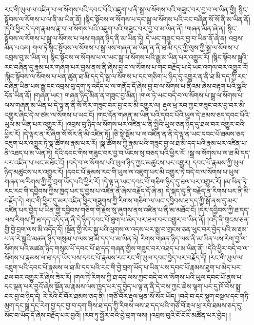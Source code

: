རང་གི་ཡུལ་ལ་འཛིན་པ་ལ་སོགས་པའི་དབང་པོའི་འཇུག་པ་ནི་སྒྲ་ལ་སོགས་པའི་གཟུང་བར་བྱ་བ་ལ་ཡིན་གྱི། སྙིང་སྟོབས་ལ་སོགས་པ་ལ་ནི་མ་ཡིན་ནོ། །སྙིང་སྟོབས་ལ་སོགས་པ་དང་སྒྲ་ལ་སོགས་པའི་རང་བཞིན་སོ་སོ་ནི་མ་ཡིན་ནོ། །དེའི་ཕྱིར་དེ་དག་རྣམས་རྣ་བ་ལ་སོགས་པའི་འཇུག་པའི་གཟུང་བར་བྱ་བ་མ་ཡིན་ནོ། །གཞན་མིན་ཞེ་ན། སྙིང་སྟོབས་ལ་སོགས་པ་སྒྲ་ལ་སོགས་པ་ལས་གཞན་ཉིད་ནི་མ་ཡིན་ཏེ། དེ་ཡང་གཟུང་བར་བྱ་བ་ཡིན་ནོ་ཞེ་ན། འབྲས་མིན་པའམ། གལ་ཏེ་སྙིང་སྟོབས་ལ་སོགས་པ་སྒྲ་ལས་གཞན་མ་ཡིན་ན་ནི་ཐ་མི་དད་ཀྱི་ལུས་ཀྱི་སྒྲ་ལ་སོགས་པ་འབྲས་བུ་མ་ཡིན་ལ། སྙིང་སྟོབས་ལ་སོགས་པ་ལ་ཡང་སྒྲ་ལ་སོགས་པའི་རྒྱུ་མ་ཡིན་པར་འགྱུར་རོ། །སྙིང་སྟོབས་སྒྲའི་རང་བཞིན་དུ་རྣམ་པར་གཞག་པར་བྱས་ནས་ནི་ཞེས་བྱ་བ་ལ་སོགས་པ་གང་བརྗོད་པ་དེ་ཡང་འགལ་བར་འགྱུར་རོ། །སྙིང་སྟོབས་ལ་སོགས་པ་ཕན་ཚུན་ཐ་མི་དད་དེ་སྒྲ་ལ་སོགས་པ་དང་གཅིག་པ་ཉིད་དུ་འགྱུར་ན་ནི་ཐ་མི་དད་ཀྱི་རང་བཞིན་ཡིན་པས་རྒྱུ་དང་འབྲས་བུ་དག་ཏུ་འདོད་པ་ལ་གནོད་དོ་ཞེས་བྱ་བ་ལ་སོགས་པ་ནིའམ་ཞེས་བརྟག་པའི་སྒྲའི་དོན་ཡིན་ནོ། །གཞན་ཡང་། གཞན་ཉིད་མིན་ན་གཟུང་བྱ་མིན། །གལ་ཏེ་ཡང་བདེ་བ་ལ་སོགས་པ་སྒྲ་ལ་སོགས་པ་ལས་གཞན་མ་ཡིན་པ་དེ་ལྟ་ན་ནི་སོ་སོར་གཟུང་བར་བྱ་བར་མི་འགྱུར་ལ། རྡུལ་ཕྲ་རབ་ཀྱང་གཟུང་བར་བྱ་བར་མི་འགྱུར་ཞིང་དེ་ལ་ཙམ་ལ་སོགས་པ་ཡང་ངོ། །གང་དོན་གཞན་མ་ཡིན་པའི་དབང་པོའི་ཡུལ་དེ་ཐམས་ཅད་དབང་པོའི་ཡུལ་མ་ཡིན་པར་འགྱུར་རོ། །འབྲས་བུ་ཉིད་ལ་སོགས་པར་འཛིན་པ་ནི་སྤྱིའི་ཡུལ་ཅན་ཉིད་དུ་ཐལ་བར་འགྱུར་བའི་ཕྱིར་རོ། །དེ་ལྟར་ན་རེ་ཞིག་སོ་སོར་ནི་མི་འཛིན་ཏོ། །ཅི་སྟེ་སྡོམ་པ་ལ་འཛིན་ན་ནི་དེ་ལྟ་ན་ཡང་དབང་པོ་ཐམས་ཅད་འཇུག་པར་འགྱུར་ཏེ་སྣ་ཚོགས་རྣམ་པར་རོ། །སྣ་ཚོགས་ཀྱི་རྣམ་པའི་གཟུང་བྱ་ལ་ཐ་མི་དད་པའི་རྣམ་པར་འཛིན་པ་ནི་འཐད་པ་མ་ཡིན་ཏེ། དེའི་དབང་གིས་གཟུང་བར་བྱ་བ་ཡོངས་སུ་བཅད་པའི་ཕྱིར་རོ། །སྒྲ་ལ་སོགས་པ་ལ་ཐ་མི་དད་པར་འཛིན་པ་ཡང་མཐོང་ངོ། །བདེ་བ་ལ་སོགས་པའི་ཡུལ་ཉིད་ཀྱང་མཚུངས་པར་འགྱུར། དབང་པོ་རྣམས་ཀྱི་ཡུལ་ཉིད་མཚུངས་པར་འགྱུར་རོ། །དབང་པོ་རྣམས་རང་གི་ཡུལ་ལ་འཇུག་པར་མི་འགྱུར་ཏེ་བདེ་བ་ལ་སོགས་པ་ཡུལ་གཞན་ལ་རིགས་ཀྱི་བྱེ་བྲག་ཡོད་པའི་ཕྱིར་རོ། །དེ་ལྟ་ན་ཡང་དབང་པོ་གཅིག་ཉིད་དུ་ཐལ་པར་འགྱུར་རོ། །མ་ཡིན་ཏེ་རང་རང་གི་དབྱིབས་ཀྱིས་ཁྱད་པར་དུ་བྱས་པ་འཛིན་ནོ་ཞེས་བརྗོད་དོ་ཞེ་ན། དེ་སྐད་དུ་ནི་བརྗོད་ན་རིགས་པར་ནི་མི་བརྗོད་དེ། གང་གི་ཕྱིར་དུ་མར་འཛིན་ཕྱིར་གཟུགས་ཀྱི་རིགས་གཅིག་ལ་ཡང་དབྱིབས་ཐ་དད་ཀྱི་སྒོ་ནས་དུ་མར་འཛིན་པར་བྱེད་པ་ཡིན་གྱི་དབྱིབས་གཅིག་གི་རྗེས་སུ་ཞུགས་ནས་འཛིན་པ་ནི་མ་མཐོང་ངོ། །དེར་དབྱིབས་ཀྱི་ཐ་དད་ལས་རིགས་ཀྱི་ཐ་དད་འདོད་ན་ནི་དེ་ཉིད་དབང་པོ་ཐུག་པ་མེད་པར་ཐལ་བར་འགྱུར་བ་ཡིན་ནོ། །འདི་ནི་གྲངས་ཅན་གྱི་བྱེ་བྲག་ལས་མི་འདོད་དོ། །སྔོན་གྱི་སེར་སྐྱ་པའི་ལུགས་ལ་འདས་པར་སྨྲ་བ་གྲངས་ཅན་ཕུང་བར་བྱེད་པའི་མ་རྡུམ་པ་ན་རེ་སྒྲའི་མཚན་ཉིད་གསུམ་པ་ལས་ཐ་མི་དད་པ་མ་ཡིན་ཏེ། རིགས་གཞན་ཉིད་ལས་ནི་མ་ཡིན་པས་རེག་བྱ་ལ་སོགས་པའི་མཚན་ཉིད་གསུམ་པོ་དབང་པོ་ཐ་དད་གཞན་གྱིས་གཟུང་བར་འཐད་པ་མ་ཡིན་ནོ། །དེའི་ཕྱིར་བདེ་བ་ལ་སོགས་པ་རྣམས་ལ་ཐ་དད་ཡོད་པས་དབང་པོ་རྣམས་རང་རང་གི་ཡུལ་དབང་བྱེད་པར་བརྗོད་དོ། །རང་གི་ཡུལ་ལ་འཇུག་པའི་དབང་པོ་རྣམས་ལ་ཐ་མི་དད་པའི་རང་གི་བྱེ་བྲག་ཡོད་པ་ཡིན་པས་དབང་པོ་རྣམས་ཐུག་པ་མེད་པར་ཐལ་བར་འགྱུར་རོ་ཞེས་ཟེར་རོ། །གལ་ཏེ་རིགས་ཀྱི་ཐ་དད་ལས་ཀྱང་བདེ་བ་ལ་སོགས་པའི་ཡུལ་དབང་པོ་ནུས་པ་དང་ལྡན་པར་བྱའོ་ཞེས་སྔོན་མ་རྣམས་ལས་ཁྱད་པར་དུ་བྱེད་པ་ལྟ་ན་ནི་དེ་བས་ཀྱང་ཆེས་ལྷག་པར་དུ་ཁོ་བོས་སྨྲ་བར་བྱ་བ་ཉིད་དེ། རེ་རེའི་ངོ་བོར་ཐམས་ཅད་ནི། །གཙོ་བོར་རྡུལ་ཕྲན་སོ་སོར་ཡོད། །བདེ་བ་དང་སྡུག་བསྔལ་དང་གཏི་མུག་དང་སྒྲ་དང་རེག་བྱ་དང་བྱ་བ་དག་གིས་ཐ་དད་ཀྱི་རིགས་ལས་ཐ་དད་པའི་གཙོ་བོ་རྡུལ་ཕྲ་རབ་ཐམས་ཅད་དུ་སོང་བ་ཡོད་དོ་ཞེས་བརྗོད་པར་བྱའོ། །རབ་ཏུ་སྦྱོར་བའི་བྱེ་བྲག་ལས། །འབྲས་བུའི་ངོ་བོར་མཚོན་པར་བྱེད། །
